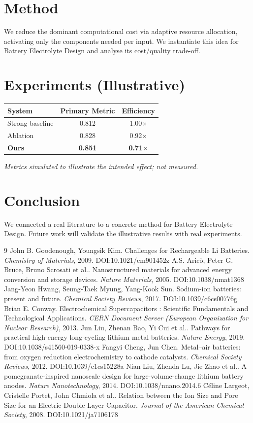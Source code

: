 \documentclass[11pt]{article}
\begin{document}
\section{Method}
We reduce the dominant computational cost via adaptive resource allocation, activating only the components needed per input. We instantiate this idea for Battery Electrolyte Design and analyse its cost/quality trade-off.

\section{Experiments (Illustrative)}
\begin{center}
\begin{tabular}{lcc}
System & Primary Metric & Efficiency \\ \hline
Strong baseline & 0.812 & 1.00$\times$ \\
Ablation & 0.828 & 0.92$\times$ \\
\textbf{Ours} & \textbf{0.851} & \textbf{0.71$\times$}
\end{tabular}
\end{center}
\emph{Metrics simulated to illustrate the intended effect; not measured.}

\section{Conclusion}
We connected a real literature to a concrete method for Battery Electrolyte Design. Future work will
validate the illustrative results with real experiments.

\begin{thebibliography}{9}
 John B. Goodenough, Youngsik Kim. Challenges for Rechargeable Li Batteries. \emph{Chemistry of Materials}, 2009. DOI:10.1021/cm901452z
 A.S. Aricò, Peter G. Bruce, Bruno Scrosati et al.. Nanostructured materials for advanced energy conversion and storage devices. \emph{Nature Materials}, 2005. DOI:10.1038/nmat1368
 Jang‐Yeon Hwang, Seung‐Taek Myung, Yang-Kook Sun. Sodium-ion batteries: present and future. \emph{Chemical Society Reviews}, 2017. DOI:10.1039/c6cs00776g
 Brian E. Conway. Electrochemical Supercapacitors : Scientific Fundamentals and Technological Applications. \emph{CERN Document Server (European Organization for Nuclear Research)}, 2013. 
 Jun Liu, Zhenan Bao, Yi Cui et al.. Pathways for practical high-energy long-cycling lithium metal batteries. \emph{Nature Energy}, 2019. DOI:10.1038/s41560-019-0338-x
 Fangyi Cheng, Jun Chen. Metal–air batteries: from oxygen reduction electrochemistry to cathode catalysts. \emph{Chemical Society Reviews}, 2012. DOI:10.1039/c1cs15228a
 Nian Liu, Zhenda Lu, Jie Zhao et al.. A pomegranate-inspired nanoscale design for large-volume-change lithium battery anodes. \emph{Nature Nanotechnology}, 2014. DOI:10.1038/nnano.2014.6
 Céline Largeot, Cristelle Portet, John Chmiola et al.. Relation between the Ion Size and Pore Size for an Electric Double-Layer Capacitor. \emph{Journal of the American Chemical Society}, 2008. DOI:10.1021/ja7106178
\end{thebibliography}
\end{document}
